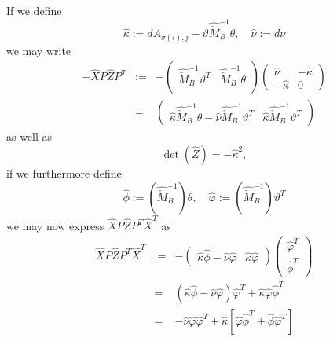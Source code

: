 \documentclass[a4paper]{article}
\begin{document}
If we define
\begin{equation}
\label{def:kappa_hat_nu_hat}
\hat{\kappa}:= dA_{\sigma(i),j}-\vartheta\hat{\check{M}}_{B}^{-1}\theta,
\quad
\hat{\nu}:=d\nu
\end{equation}
we may write
\begin{eqnarray}
-\hat{X}P\hat{Z}P^{T}
&:=&
-
\left(
\begin{array}{c|c}
\hat{\check{M}}_{B}^{-1}\vartheta^{T}
&
\hat{\check{M}}_{B}^{-1}\theta  \\
\end{array}
\right)
\left(
\begin{array}{c|c}
\hat{\nu}     & -\hat{\kappa} \\
\hline
-\hat{\kappa} & 0
\end{array}
\right)
\nonumber \\
&=&
\left(
\begin{array}{c|c}
\hat{\kappa}\hat{\check{M}}_{B}^{-1}\theta
-\hat{\nu}\hat{\check{M}}_{B}^{-1}\vartheta^{T}
&
\hat{\kappa}\hat{\check{M}}_{B}^{-1}\vartheta^{T}
\end{array}
\right)
\end{eqnarray}
as well as 
\begin{equation}
\det(\hat{Z})=-\hat{\kappa}^{2},
\end{equation}
if we furthermore define
\begin{equation}
\label{def:phi_hat_varphi_hat}
\hat{\phi}:=\left(\hat{\check{M}}_{B}^{-1}\right)\theta,
\quad
\hat{\varphi}:=\left(\hat{\check{M}}_{B}^{-1}\right)\vartheta^{T}
\end{equation}
we may now express $\hat{X}P\hat{Z}P^{T}\hat{X}^{T}$ as
\begin{eqnarray}
\hat{X}P\hat{Z}P^{T}\hat{X}^{T}
&:=&
-
\left(
\begin{array}{c|c}
\hat{\kappa}\hat{\phi}-\hat{\nu}\hat{\varphi}
&
\hat{\kappa}\hat{\varphi}
\end{array}
\right)
\left(
\begin{array}{c}
\hat{\varphi}^{T}  \\
\hline
\hat{\phi}^{T}
\end{array}
\right)
\nonumber \\
&=&
\left(
  \hat{\kappa}\hat{\phi}-\hat{\nu}\hat{\varphi}
\right)
\hat{\varphi}^{T}
+\hat{\kappa}\hat{\varphi}\hat{\phi}^{T}
\nonumber \\
&=&
-\hat{\nu}\hat{\varphi}\hat{\varphi}^{T}
+\hat{\kappa}
 \left[
   \hat{\varphi}\hat{\phi}^{T}+\hat{\phi}\hat{\varphi}^{T}
 \right]
\end{eqnarray}
\end{document}
